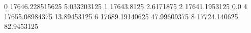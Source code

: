 0 17646.228515625 5.033203125
1 17643.8125 2.6171875
2 17641.1953125 0.0
4 17655.08984375 13.89453125
6 17689.19140625 47.99609375
8 17724.140625 82.9453125
